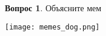 \documentclass[12pt]{article}
\theoremstyle{definition}
\newtheorem{question}{Вопрос}
\begin{document}

\newpage 

\begin{question}
Объясните мем
\begin{center}
	\texttt{[image: memes\_dog.png]}
\end{center}
\end{question}
\end{document}
